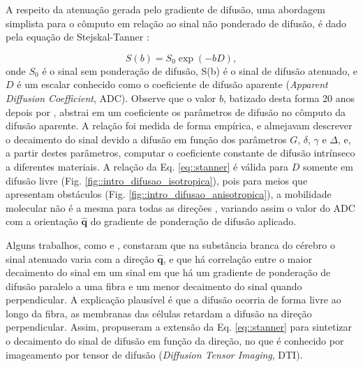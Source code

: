 \documentclass[
    12pt,                %
    oneside,            %
    a4paper,            %
    english,            %
    french,                %
    spanish,            %
    brazil                %
    ]{abntex2}
\begin{document}

A respeito da atenuação gerada pelo gradiente de difusão, uma abordagem simplista \cite{descoteaux2015} para o cômputo em relação ao sinal não ponderado de difusão, é dado pela equação de Stejskal-Tanner \cite{stejskal1965}:

\begin{equation}
\label{eq::stanner}
    S(b) = S_0\exp{(-bD)} ,
\end{equation}
onde $S_0$ é o sinal sem ponderação de difusão, S(b) é o sinal de difusão atenuado, e $D$ é um escalar conhecido como o coeficiente de difusão aparente (\textit{Apparent Diffusion Coefficient}, ADC). Observe que o valor $b$, batizado desta forma 20 anos depois por , abstrai em um coeficiente os parâmetros de difusão no cômputo da difusão aparente. A relação foi medida de forma empírica, e  almejavam descrever o decaimento do sinal devido a difusão em função dos parâmetros $G$, $\delta$, $\gamma$ e $\Delta$, e, a partir destes parâmetros, computar o coeficiente constante de difusão intrínseco a diferentes materiais.
A relação da Eq. \ref{eq::stanner} é válida para $D$ somente em difusão livre (Fig. \ref{fig::intro_difusao_isotropica}), pois para meios que apresentam obstáculos (Fig. \ref{fig::intro_difusao_anisotropica}), a mobilidade molecular não é a mesma para todas as direções \cite{douek1991}, variando assim o valor do ADC com a orientação $\mathbf{\hat{q}}$ do gradiente de ponderação de difusão aplicado.

Alguns trabalhos, como  e , constaram que na substância branca do cérebro o sinal atenuado varia com a direção $\mathbf{\hat{q}}$, e que há correlação entre o maior decaimento do sinal em um sinal em que há um gradiente de ponderação de difusão paralelo a uma fibra e um menor decaimento do sinal quando perpendicular. A explicação plausível \cite{Basser1994} é que a difusão ocorria de forma livre ao longo da fibra, as membranas das células retardam a difusão na direção perpendicular. Assim,  propuseram a extensão da Eq. \ref{eq::stanner} para sintetizar o decaimento do sinal de difusão em função da direção, no que é conhecido por imageamento por tensor de difusão (\textit{Diffusion Tensor Imaging}, DTI).


\end{document}

